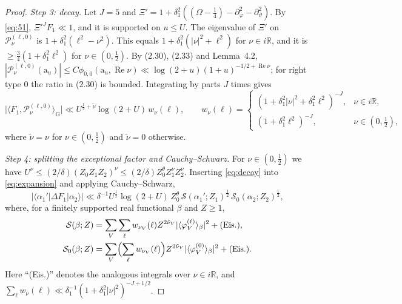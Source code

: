 \documentclass[11pt]{amsart}
\theoremstyle{remark}
\theoremstyle{definition}
\numberwithin{equation}{section}
\newcommand{\R}{\mathbb{R}}
\newcommand{\G}{\mathrm{G}}
\newcommand{\br}[1]{\langle #1\rangle}
\newcommand{\Pc}{\mathcal{P}}
\newcommand{\ra}{\mathrm{a}}
\begin{document}
\begin{proof}
\emph{Step 3: decay.} Let $J=5$ and $\Xi'=1+\delta_1^2((\Omega-\frac14)-\partial_\varphi^2-\partial_\vartheta^2)$. By \eqref{eq:51}, $\Xi'^JF_1\ll1$, and it is supported on $u\le U$. The eigenvalue of $\Xi'$ on $\Pc_\nu^{(\ell,0)}$ is $1+\delta_1^2(\ell^2-\nu^2)$. This equals $1+\delta_1^2(|\nu|^2+\ell^2)$ for $\nu\in i\R$, and it is $\ge\frac34(1+\delta_1^2\ell^2)$ for $\nu\in(0,\frac12)$. By (2.30), (2.33) and Lemma~4.2, $|\Pc_\nu^{(\ell,0)}(\ra_u)|\le C\phi_{0,0}(\ra_u,\operatorname{Re}\nu)\ll\log(2+u)(1+u)^{-1/2+\operatorname{Re}\nu}$; for right type $0$ the ratio in (2.30) is bounded. Integrating by parts $J$ times gives
\begin{equation}\label{eq:decay}
\bigl|\br{F_1,\Pc_\nu^{(\ell,0)}}_\G\bigr|\ll U^{\frac12+\tilde\nu}\log(2+U)\,w_\nu(\ell),\qquad w_\nu(\ell)=\begin{cases}(1+\delta_1^2|\nu|^2+\delta_1^2\ell^2)^{-J},&\nu\in i\R,\\(1+\delta_1^2\ell^2)^{-J},&\nu\in(0,\frac12),\end{cases}
\end{equation}
where $\tilde\nu=\nu$ for $\nu\in(0,\frac12)$ and $\tilde\nu=0$ otherwise.

\emph{Step 4: splitting the exceptional factor and Cauchy--Schwarz.} For $\nu\in(0,\frac12)$ we have $U^{\nu}\le(2/\delta)(Z_0Z_1Z_2)^{\nu}\le(2/\delta)Z_0^{\theta}Z_1^{\nu}Z_2^{\nu}$. Inserting \eqref{eq:decay} into \eqref{eq:expansion} and applying Cauchy--Schwarz,
\begin{equation}\label{eq:CS}
|\br{\alpha_1'|\Delta F_1|\alpha_2}|\ll\delta^{-1}U^{\frac12}\log(2+U)\,Z_0^\theta\,\mathcal S(\alpha_1';Z_1)^{\frac12}\,\mathcal S_0(\alpha_2;Z_2)^{\frac12},
\end{equation}
where, for a finitely supported real functional $\beta$ and $Z\ge1$,
\begin{align*}
\mathcal S(\beta;Z)&=\sum_{V}\sum_{\ell}w_{\nu_V}(\ell)Z^{2\tilde\nu_V}|\br{\varphi_V^{(\ell)}}_\beta|^2+(\text{Eis.}),\\
\mathcal S_0(\beta;Z)&=\sum_{V}\Bigl(\sum_\ell w_{\nu_V}(\ell)\Bigr)Z^{2\tilde\nu_V}|\br{\varphi_V^{(0)}}_\beta|^2+(\text{Eis.}).
\end{align*}
Here ``(Eis.)'' denotes the analogous integrals over $\nu\in i\R$, and $\sum_\ell w_\nu(\ell)\ll\delta_1^{-1}(1+\delta_1^2|\nu|^2)^{-J+1/2}$.


\end{proof}
\end{document}
